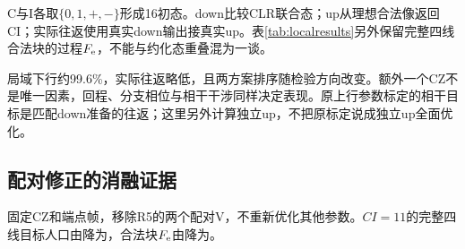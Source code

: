 C与I各取$\{0,1,+,-\}$形成16初态。down比较CLR联合态；up从理想合法像返回CI；实际往返使用真实down输出接真实up。表\ref{tab:localresults}另外保留完整四线合法块的过程$F_{\mathrm e}$，不能与约化态重叠混为一谈。


局域下行约99.6\%，实际往返略低，且两方案排序随检验方向改变。额外一个CZ不是唯一因素，回程、分支相位与相干干涉同样决定表现。原上行参数标定的相干目标是匹配down准备的往返；这里另外计算独立up，不把原标定说成独立up全面优化。

\subsection{配对修正的消融证据}
固定CZ和端点帧，移除R5的两个配对V，不重新优化其他参数。$CI=11$的完整四线目标人口由\RfivePairPop{}降为\RfiveNoPairPop{}，合法块$F_{\mathrm e}$由\RfiveLocalFe{}降为\RfiveNoPairFe{}。
\FloatBarrier

